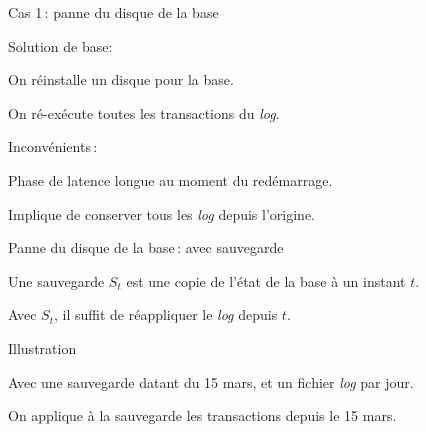 \documentclass[aspectratio=169, handout]{beamer} %
\begin{document}
\begin{frame}{Cas 1\,: panne du disque de la base}

Solution de base: 

       \begin{redbullet}
       \item On réinstalle un disque pour la base.
     \item  On ré-exécute toutes les transactions du \textit{log}.
    \end{redbullet}


\vfill

\begin{blocgauche}
Inconvénients\,:
       \begin{redbullet}
       \item Phase de latence longue au moment du redémarrage.
     \item Implique de conserver tous les \textit{log} depuis l'origine.
    \end{redbullet}

\end{blocgauche}
\end{frame}


\begin{frame}{Panne du disque de la base\,: avec sauvegarde}

Une \alert{sauvegarde} $S_t$ est une copie de \alert{l'état de la base} à un instant $t$.

\vfill


\vfill

\begin{blocgauche}
Avec  $S_t$, il suffit
de réappliquer le  \textit{log} depuis $t$.
\end{blocgauche}
\end{frame}


\begin{frame}{Illustration}

Avec une sauvegarde datant du 15 mars, et un fichier \textit{log} par jour.

\vfill


\vfill
\begin{blocgauche}
On applique à la sauvegarde les transactions depuis le 15 mars.
\end{blocgauche}
\end{frame}
\end{document}
